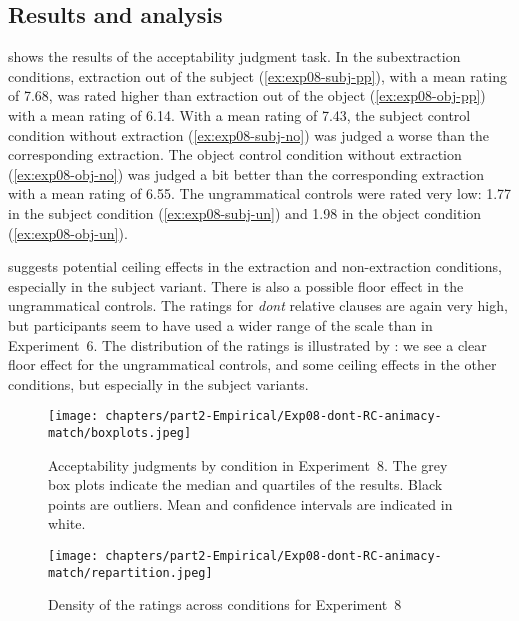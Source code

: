 \subsection{Results and analysis}

 shows the results of the acceptability judgment task.
In the subextraction conditions, extraction out of the subject (\ref{ex:exp08-subj-pp}), with a mean rating of 7.68, was rated higher than extraction out of the object (\ref{ex:exp08-obj-pp}) with a mean rating of 6.14. With a mean rating of 7.43, the subject control condition without extraction (\ref{ex:exp08-subj-no}) was judged a worse than the corresponding extraction. The object control condition without extraction (\ref{ex:exp08-obj-no}) was judged a bit better than the corresponding extraction with a mean  rating of 6.55. The ungrammatical controls were rated very low: 1.77 in the subject condition (\ref{ex:exp08-subj-un}) and 1.98 in the object condition (\ref{ex:exp08-obj-un}).\largerpage[2.25]

 suggests potential ceiling effects in the extraction and non-ex\-trac\-tion conditions, especially in the subject variant. There is also a possible floor effect in the ungrammatical controls. The ratings for \emph{dont} relative clauses are again very high, but participants seem to have used a wider range of the scale than in Experiment~6. The distribution of the ratings is illustrated by : we see a clear floor effect for the ungrammatical controls, and some ceiling effects in the other conditions, but especially in the subject variants.\pagebreak

\begin{figure}
    \centering
    \texttt{[image: chapters/part2-Empirical/Exp08-dont-RC-animacy-match/boxplots.jpeg]}
    \caption{Acceptability judgments by condition in Experiment~8. The grey box plots indicate the median and quartiles of the results. Black points are outliers. Mean and confidence intervals are indicated in white.}
    \label{fig:exp08-boxplot}
\end{figure}

\begin{figure}
    \centering
    \texttt{[image: chapters/part2-Empirical/Exp08-dont-RC-animacy-match/repartition.jpeg]}
    \caption{Density of the ratings across conditions for Experiment~8}
    \label{fig:exp08-repartition}
\end{figure}

